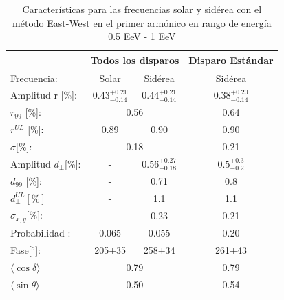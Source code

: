 \begin{table}[H]
        \begin{small}
            \begin{center}
                \begin{tabular}[c]{l|c|c||c|}
\cline{2-4}                                       & \multicolumn{2}{c||}{Todos los disparos}    & \multicolumn{1}{c|}{Disparo Estándar}   \\ \hline
\multicolumn{1}{|l|}{Frecuencia:                } & Solar	                & Sidérea	                & Sidérea \cite{Aab_2020}   \\ \hline
\multicolumn{1}{|l|}{Amplitud r [\%]:           } & $0.43^{+0.21}_{-0.14}$	& $0.44^{+0.21}_{-0.14}$ 	& $0.38^{+0.20}_{-0.14}$ \cite{codigo}      \\
\multicolumn{1}{|l|}{$r_{99}$ [\%]:             } & \multicolumn{2}{c||}{0.56}                         & 0.64\cite{codigo}                 \\
\multicolumn{1}{|l|}{$r^{UL}$ [\%]:             } & 0.89 	                & 0.90                      & 0.90 \cite{codigo}                 \\ 
\multicolumn{1}{|l|}{$\sigma$[\%]:              } & \multicolumn{2}{c||}{0.18}                         & 0.21 \cite{codigo}      \\\hline
\multicolumn{1}{|l|}{Amplitud $d_\perp$[\%]:    } & -	                    & $0.56^{+0.27}_{-0.18}$ 	& $0.5^{+0.3}_{-0.2}$       \\
\multicolumn{1}{|l|}{$d_{99}$ [\%]:             } & - 	                    & 0.71                      & 0.8   \cite{codigo}                \\
\multicolumn{1}{|l|}{$d_{\perp}^{UL}[\%]$       } & -                       & 1.1                       & 1.1                         \\
\multicolumn{1}{|l|}{$\sigma_{x,y}$[\%]:        } & -	                    & 0.23	                    & 0.21       \\\hline
\multicolumn{1}{|l|}{Probabilidad      :        } & 0.065                   & 0.055	                    & 0.20       \\
\multicolumn{1}{|l|}{Fase[$^o$]:                } & 205$\pm$35              & 258$\pm$34                & 261$\pm$43\\ \hline
\multicolumn{1}{|l|}{$\langle\cos\delta \rangle$} & \multicolumn{2}{c||}{0.79}        	                & 0.79 \cite{codigo}        \\        
\multicolumn{1}{|l|}{$\langle\sin\theta \rangle$} & \multicolumn{2}{c||}{0.50}        	                & 0.54\cite{codigo}        \\ \hline       
                \end{tabular}
            \end{center}
        \end{small}
        \caption{Características para las frecuencias solar y sidérea con el método East-West en el primer armónico en rango de energía 0.5 EeV - 1 EeV}
        \label{tab:segundo_bin_data}
    \end{table}


